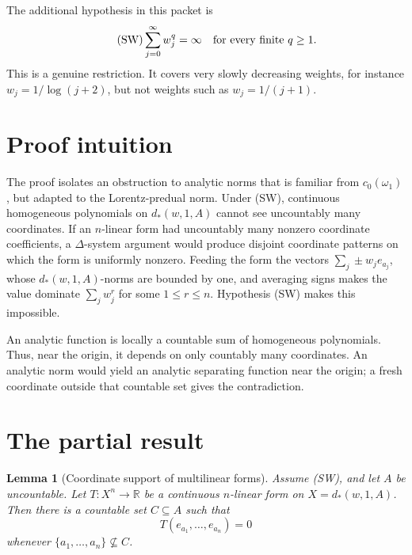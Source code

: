 \documentclass[11pt]{article}
\newtheorem{lemma}{Lemma}
\newcommand{\R}{\mathbb R}
\begin{document}
The additional hypothesis in this packet is
\[
  \tag{SW} \sum_{j=0}^\infty w_j^q=\infty
  \quad\hbox{for every finite }q\ge1.
\]
This is a genuine restriction.  It covers very slowly decreasing weights, for
instance \(w_j=1/\log(j+2)\), but not weights such as \(w_j=1/(j+1)\).

\section{Proof intuition}

The proof isolates an obstruction to analytic norms that is familiar from
\(c_0(\omega_1)\), but adapted to the Lorentz-predual norm.  Under (SW),
continuous homogeneous polynomials on \(d_*(w,1,A)\) cannot see uncountably
many coordinates.  If an \(n\)-linear form had uncountably many nonzero
coordinate coefficients, a \(\Delta\)-system argument would produce disjoint
coordinate patterns on which the form is uniformly nonzero.  Feeding the form
the vectors \(\sum_j \pm w_j e_{a_j}\), whose \(d_*(w,1,A)\)-norms are bounded
by one, and averaging signs makes the value dominate
\(\sum_j w_j^r\) for some \(1\le r\le n\).  Hypothesis (SW) makes this
impossible.

An analytic function is locally a countable sum of homogeneous polynomials.
Thus, near the origin, it depends on only countably many coordinates.  An
analytic norm would yield an analytic separating function near the origin; a
fresh coordinate outside that countable set gives the contradiction.

\section{The partial result}

\begin{lemma}[Coordinate support of multilinear forms]\label{lem:multi}
Assume (SW), and let \(A\) be uncountable.  Let
\(T\colon X^n\to\R\) be a continuous \(n\)-linear form on
\(X=d_*(w,1,A)\).  Then there is a countable set \(C\subseteq A\) such that
\[
  T(e_{a_1},\ldots,e_{a_n})=0
\]
whenever \(\{a_1,\ldots,a_n\}\not\subseteq C\).
\end{lemma}
\end{document}
